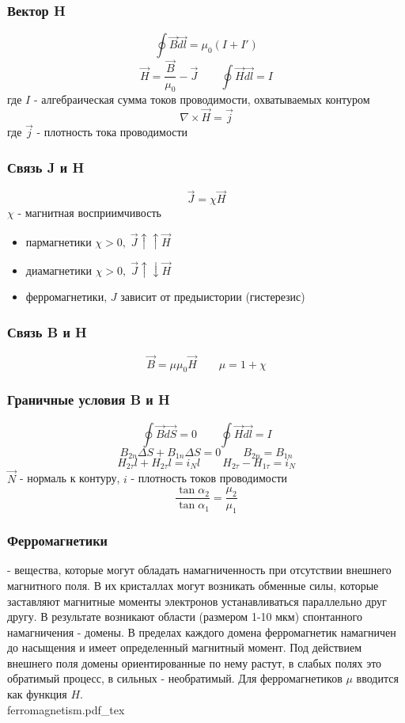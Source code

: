 \documentclass{article}
\newcommand{\incfig}[2][1]{%
    \def\svgwidth{#1\columnwidth}
    {#2.pdf_tex}
}
\begin{document}
\subsubsection{Вектор H}
\[\oint\vec{B}\vec{dl}=\mu_{0}(I+I')\]
\[\vec{H}=\frac{\vec{B}}{\mu_{0}}-\vec{J} \qquad \oint\vec{H}\vec{dl}=I\]
где $I$ - алгебраическая сумма токов проводимости, охватываемых контуром
\[\nabla\times\vec{H}=\vec{j}\]
где $\vec{j}$ - плотность тока проводимости
\subsubsection{Связь J и H}
\[\vec{J}=\chi\vec{H}\]
$\chi$ - магнитная восприимчивость
\begin{itemize}
    \item пармагнетики $\chi > 0, \; \vec{J}\uparrow\uparrow\vec{H}$
    \item диамагнетики $\chi > 0, \; \vec{J}\uparrow\downarrow\vec{H}$
    \item ферромагнетики, $J$ зависит от предыистории (гистерезис)
\end{itemize}
\subsubsection{Связь B и H}
\[\vec{B}=\mu\mu_{0}\vec{H} \qquad \mu=1+\chi\]
\subsubsection{Граничные условия B и H}
\[\oint\vec{B}\vec{dS}=0 \qquad \oint\vec{H}\vec{dl}=I\]
\[B_{2n}\Delta S + B_{1n}\Delta S=0 \qquad B_{2n}=B_{1n}\]
\[H_{2\tau}l+H_{2\tau}l=i_{N}l \qquad H_{2\tau}-H_{1\tau}=i_{N}\]
$\vec{N}$ - нормаль к контуру, $i$ - плотность токов проводимости
\[\frac{\tan\alpha_{2}}{\tan\alpha_{1}}=\frac{\mu_{2}}{\mu_{1}}\]
\subsubsection{Ферромагнетики}
- вещества, которые могут обладать намагниченность при отсутствии внешнего магнитного поля.
В их кристаллах могут возникать обменные силы, которые заставляют магнитные моменты электронов устанавливаться параллельно друг другу.
В результате возникают области (размером 1-10 мкм) спонтанного намагничения - домены. В пределах каждого домена ферромагнетик намагничен до насыщения и имеет определенный магнитный момент.
Под действием внешнего поля домены ориентированные по нему растут, в слабых полях это обратимый процесс, в сильных - необратимый.
Для ферромагнетиков $\mu$ вводится как функция $H$. \\
\incfig{ferromagnetism}
\end{document}
